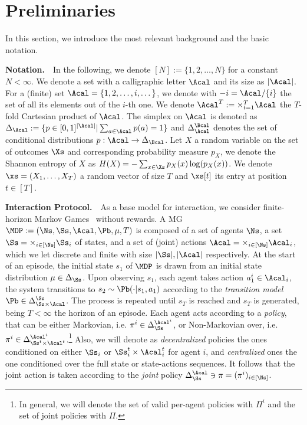 \section{Preliminaries}
\label{sec:setting}
In this section, we introduce the most relevant background and the basic notation.

\textbf{Notation.}~~In the following, we denote $[N] := \{1, 2, \ldots, N\}$ for a constant $N < \infty$. We denote a set with a calligraphic letter $\Acal$ and its size as $|\Acal|$. For a (finite) set $\Acal = \{1,2,\dots, i, \dots\}$, we denote with $-i = \Acal / \{i\}$ the set of all its elements out of the $i$-th one. We denote $\Acal^T := \times_{t = 1}^T \Acal$ the $T$-fold Cartesian product of $\Acal$. The simplex on $\Acal$ is denoted as $\Delta_{\Acal} := \{ p \in [0, 1]^{|\Acal|} | \sum_{a \in \Acal} p(a) = 1 \}$ and $\Delta_{\Acal}^{\Bcal}$ denotes the set of conditional distributions $p: \Acal \to \Delta_\Bcal$. Let $X$ a random variable on the set of outcomes $\Xs$ and corresponding probability measure $p_X$, we denote the Shannon entropy of $X$ as $H (X) = - \sum_{x \in \Xs} p_X (x) \log (p_X (x))$. We denote $\xs = (X_1, \ldots, X_T)$ a random vector of size $T$ and $\xs[t]$ its entry at position $t \in [T]$.

\textbf{Interaction Protocol.}~~As a base model for interaction, we consider finite-horizon Markov Games~\citep[MGs,][]{Littman1994} without rewards. A MG $\MDP := (\Ns, \Ss, \Acal, \Pb, \mu, T)$ is composed of a set of agents $\Ns$, a set $\Ss = \times_{i \in [\Ns]} \Ss_i$ of states, and a set of (joint) actions $\Acal = \times_{i \in [\Ns]} \Acal_i$, which we let discrete and finite with size $|\Ss|, |\Acal|$ respectively. At the start of an episode, the initial state $s_1$ of $\MDP$ is drawn from an initial state distribution $\mu \in \Delta_{\Ss}$. Upon observing $s_1$, each agent takes action $a_1^i \in \Acal_i$, the system transitions to $s_2 \sim \Pb(\cdot|s_1, a_1)$ according to the \emph{transition model} $\Pb \in \Delta^{\Ss}_{\Ss \times \Acal}$. The process is repeated until $s_T$ is reached and $s_T$ is generated, being $T < \infty$ the horizon of an episode. Each agent acts according to a \emph{ policy}, that can be either Markovian, i.e. $\pi^i \in \Delta_{\Ss}^{\Acal^i}$, or Non-Markovian over, i.e. $\pi^i \in \Delta_{\Ss^t\times \Acal^t}^{\Acal^i}$.\footnote{In general, we will denote the set of valid per-agent policies with $\Pi^i$ and the set of joint policies with $\Pi$.} Also, we will denote as \emph{decentralized} policies the ones conditioned on either $\Ss_i$ or $\Ss^t_i\times \Acal^t_i$ for agent $i$, and \emph{centralized} ones the one conditioned over the full state or state-actions sequences. It follows that the joint action is taken according to the \emph{joint} policy $\Delta_{\Ss}^{\Acal}  \ni\pi = (\pi^{i})_{i \in [\Ns]}$. 

